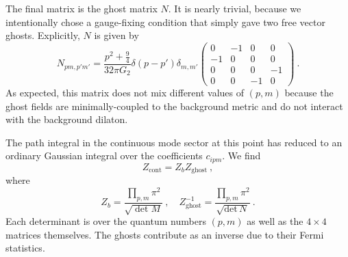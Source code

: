 \documentclass[12pt]{article}
\begin{document}
The final matrix is the ghost matrix $N$. It is nearly trivial, because we intentionally chose a gauge-fixing condition that simply gave two free vector ghosts.  Explicitly, $N$ is given by
\begin{equation}
	N_{p m,p'm'} = \frac{p^2 + \frac{9}{4}}{32\pi G_2} \delta(p-p')\delta_{m,m'}
	\begin{pmatrix} 
		0 & -1 & 0 & 0 \\
		-1 & 0 & 0 & 0 \\
		0 & 0 & 0 & -1 \\
		0 & 0 & -1 & 0
	\end{pmatrix}~.
\end{equation}
As expected, this matrix does not mix different values of $(p,m)$ because the ghost fields are minimally-coupled to the background metric and do not interact with the background dilaton.

The path integral in the continuous mode sector at this point has reduced to an ordinary Gaussian integral over the coefficients $c_{i p m}$. We find
\begin{equation}
	Z_\text{cont} = Z_b Z_\text{ghost}~,
\end{equation}
where 
\begin{equation}
	Z_{b} = \frac{\prod_{p,m}\pi^2}{\sqrt{\det M}}~, \quad Z_\text{ghost}^{-1} =\frac{\prod_{p,m}\pi^2}{\sqrt{\text{det}\,N}}~.
\end{equation}
Each determinant is over the quantum numbers $(p,m)$ as well as the $4 \times 4$ matrices themselves. The ghosts contribute as an inverse due to their Fermi statistics. 
\end{document}
